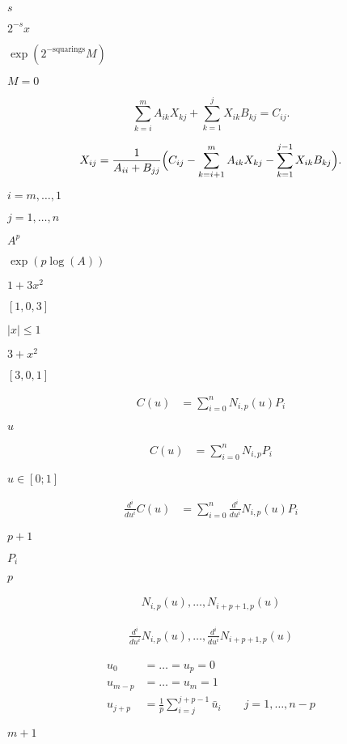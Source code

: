 \documentclass{article}
\begin{document}
$ s $
\pagebreak

$ 2^{-s} x $
\pagebreak

$ \exp(2^{-\mbox{squarings}}M) $
\pagebreak

$ M = 0 $
\pagebreak

\[ \sum_{k=i}^m A_{ik} X_{kj} + \sum_{k=1}^j X_{ik} B_{kj} = C_{ij}. \]
\pagebreak

\[ X_{ij} = \frac{1}{A_{ii} + B_{jj}} \Bigl( C_{ij} - \sum_{k=i+1}^m A_{ik} X_{kj} - \sum_{k=1}^{j-1} X_{ik} B_{kj} \Bigr). \]
\pagebreak

$ i=m,\ldots,1 $
\pagebreak

$ j=1,\ldots,n $
\pagebreak

$ A^p $
\pagebreak

$ \exp(p \log(A)) $
\pagebreak

$ 1 + 3x^2 $
\pagebreak

$ [ 1, 0, 3 ] $
\pagebreak

$ |x| \le 1 $
\pagebreak

$ 3 + x^2 $
\pagebreak

$ [ 3, 0, 1 ] $
\pagebreak

\begin{align*} C(u) & = \sum_{i=0}^{n}N_{i,p}(u)P_i \end{align*}
\pagebreak

$u$
\pagebreak

\begin{align*} C(u) & = \sum_{i=0}^{n}N_{i,p}P_i \end{align*}
\pagebreak

$u \in [0;1]$
\pagebreak

\begin{align*} \frac{d^i}{du^i}C(u) & = \sum_{i=0}^{n} \frac{d^i}{du^i} N_{i,p}(u)P_i \end{align*}
\pagebreak

$p+1$
\pagebreak

$P_i$
\pagebreak

$p$
\pagebreak

\begin{align*} N_{i,p}(u), \hdots, N_{i+p+1,p}(u) \end{align*}
\pagebreak

\begin{align*} \frac{d^i}{du^i} N_{i,p}(u), \hdots, \frac{d^i}{du^i} N_{i+p+1,p}(u) \end{align*}
\pagebreak

\begin{align*} u_0 & = \hdots = u_p = 0 \\ u_{m-p} & = \hdots = u_{m} = 1 \\ u_{j+p} & = \frac{1}{p}\sum_{i=j}^{j+p-1}\bar{u}_i \quad\quad j=1,\hdots,n-p \end{align*}
\pagebreak

$m+1$
\pagebreak
\end{document}

